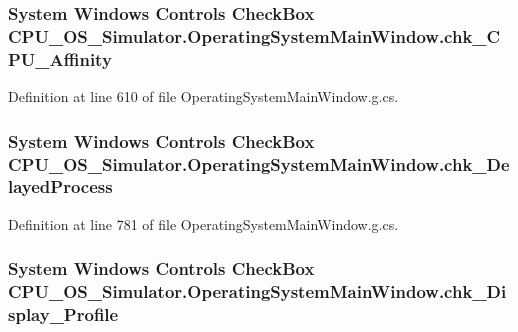 \subsubsection[{chk\+\_\+\+C\+P\+U\+\_\+\+Affinity}]{\setlength{\rightskip}{0pt plus 5cm}System Windows Controls Check\+Box C\+P\+U\+\_\+\+O\+S\+\_\+\+Simulator.\+Operating\+System\+Main\+Window.\+chk\+\_\+\+C\+P\+U\+\_\+\+Affinity\hspace{0.3cm}{\ttfamily [package]}}\label{class_c_p_u___o_s___simulator_1_1_operating_system_main_window_a5f027a391759480d1d00c76c2171c6b9}


Definition at line 610 of file Operating\+System\+Main\+Window.\+g.\+cs.

\hypertarget{class_c_p_u___o_s___simulator_1_1_operating_system_main_window_aa7e58acf30f50880e309615f92f0ef8e}{}
\subsubsection[{chk\+\_\+\+Delayed\+Process}]{\setlength{\rightskip}{0pt plus 5cm}System Windows Controls Check\+Box C\+P\+U\+\_\+\+O\+S\+\_\+\+Simulator.\+Operating\+System\+Main\+Window.\+chk\+\_\+\+Delayed\+Process\hspace{0.3cm}{\ttfamily [package]}}\label{class_c_p_u___o_s___simulator_1_1_operating_system_main_window_aa7e58acf30f50880e309615f92f0ef8e}


Definition at line 781 of file Operating\+System\+Main\+Window.\+g.\+cs.

\hypertarget{class_c_p_u___o_s___simulator_1_1_operating_system_main_window_aa13338d96952aafec3ecbc7f4fa6fcfc}{}
\subsubsection[{chk\+\_\+\+Display\+\_\+\+Profile}]{\setlength{\rightskip}{0pt plus 5cm}System Windows Controls Check\+Box C\+P\+U\+\_\+\+O\+S\+\_\+\+Simulator.\+Operating\+System\+Main\+Window.\+chk\+\_\+\+Display\+\_\+\+Profile\hspace{0.3cm}{\ttfamily [package]}}\label{class_c_p_u___o_s___simulator_1_1_operating_system_main_window_aa13338d96952aafec3ecbc7f4fa6fcfc}


